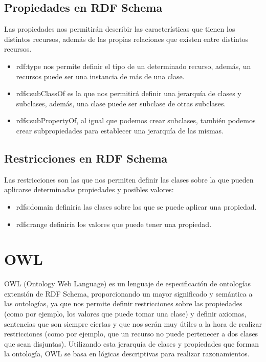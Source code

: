 \subsection{Propiedades en RDF Schema}
Las propiedades nos permitirán describir las características que tienen los distintos recursos, además de las propias relaciones que existen entre distintos recursos.

	\begin{itemize}
		\item rdf:type nos permite definir el tipo de un determinado recurso, además, un recursos puede ser una instancia de más de una clase.
		\item rdfs:subClassOf es la que nos permitirá definir una jerarquía de clases y subclases, además, una clase puede ser subclase de otras subclases.
		\item rdfs:subPropertyOf, al igual que podemos crear subclases, también podemos crear subpropiedades para establecer una jerarquía de las mismas.
	\end{itemize}

\subsection{Restricciones en RDF Schema}	

Las restricciones son las que nos permiten definir las clases sobre la que pueden aplicarse determinadas propiedades y posibles valores:

	\begin{itemize}
		\item rdfs:domain definiría las clases sobre las que se puede aplicar una propiedad.
		\item rdfs:range definiría los valores que puede tener una propiedad.
	\end{itemize}

\newpage
\section{OWL}

OWL (Ontology Web Language) es un lenguaje de especificación de ontologías extensión de RDF Schema, proporcionando un mayor significado y semántica a las ontologías, ya que nos permite definir restricciones sobre las propiedades (como por ejemplo, los valores que puede tomar una clase) y definir axiomas, sentencias que son siempre ciertas y que nos serán muy útiles a la hora de realizar restricciones (como por ejemplo, que un recurso no puede pertenecer a dos clases que sean disjuntas). Utilizando esta jerarquía de clases y propiedades que forman la ontología, OWL se basa en lógicas descriptivas para realizar razonamientos.

